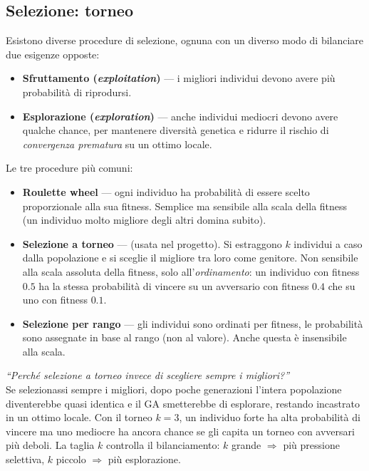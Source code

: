 \documentclass[11pt,a4paper]{article}
\begin{document}
\subsection{Selezione: torneo}

Esistono diverse procedure di selezione, ognuna con un diverso modo di
bilanciare due esigenze opposte:

\begin{itemize}
    \item \textbf{Sfruttamento (\emph{exploitation})} --- i migliori
          individui devono avere più probabilità di riprodursi.
    \item \textbf{Esplorazione (\emph{exploration})} --- anche individui
          mediocri devono avere qualche chance, per mantenere diversità
          genetica e ridurre il rischio di \emph{convergenza prematura}
          su un ottimo locale.
\end{itemize}

Le tre procedure più comuni:

\begin{itemize}
    \item \textbf{Roulette wheel} --- ogni individuo ha probabilità di
          essere scelto proporzionale alla sua fitness. Semplice ma sensibile
          alla scala della fitness (un individuo molto migliore degli altri
          domina subito).
    \item \textbf{Selezione a torneo} --- (usata nel progetto). Si estraggono
          $k$ individui a caso dalla popolazione e si sceglie il migliore tra
          loro come genitore. Non sensibile alla scala assoluta della fitness,
          solo all'\emph{ordinamento}: un individuo con fitness $0.5$ ha la
          stessa probabilità di vincere su un avversario con fitness $0.4$
          che su uno con fitness $0.1$.
    \item \textbf{Selezione per rango} --- gli individui sono ordinati per
          fitness, le probabilità sono assegnate in base al rango (non al
          valore). Anche questa è insensibile alla scala.
\end{itemize}

\begin{domanda}
\textit{``Perché selezione a torneo invece di scegliere sempre i migliori?''}\\
Se selezionassi sempre i migliori, dopo poche generazioni l'intera
popolazione diventerebbe quasi identica e il GA smetterebbe di esplorare,
restando incastrato in un ottimo locale. Con il torneo $k=3$, un individuo
forte ha alta probabilità di vincere ma uno mediocre ha ancora chance se
gli capita un torneo con avversari più deboli. La taglia $k$ controlla il
bilanciamento: $k$ grande $\Rightarrow$ più pressione selettiva, $k$
piccolo $\Rightarrow$ più esplorazione.
\end{domanda}
\end{document}
